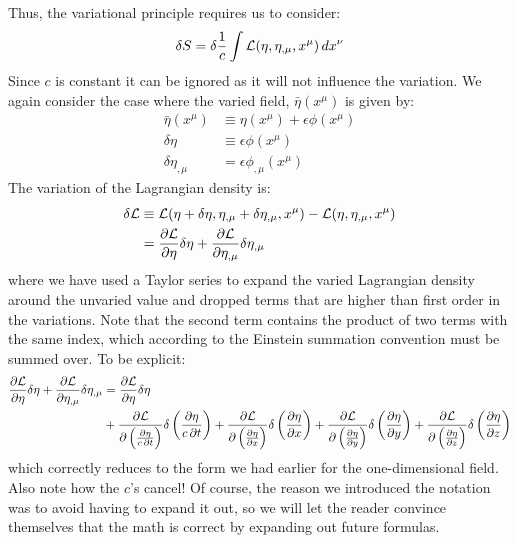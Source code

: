 Thus, the variational principle requires us to consider:
\begin{align}
\delta S=\delta \frac{1}{c} \int \mathcal{L}(\eta,\eta_{,\mu},x^\mu) \,dx^\nu
\end{align}
Since $c$ is constant it can be ignored as it will not influence the variation. We again consider the case where the varied field, $\bar\eta(x^\mu)$ is given by:
\begin{align}
\bar\eta(x^\mu)&\equiv\eta(x^\mu)+\epsilon\phi(x^\mu)\nonumber\\
\delta \eta&\equiv\epsilon\phi(x^\mu)\nonumber\\
\delta \eta_{,\mu}&=\epsilon\phi_{,\mu}(x^\mu)
\end{align}
The variation of the Lagrangian density is:
\begin{align}
\delta \mathcal{L} &\equiv \mathcal{L}(\eta+\delta\eta,\eta_{,\mu}+\delta\eta_{,\mu},x^\mu)-\mathcal{L}(\eta,\eta_{,\mu},x^\mu)\nonumber\\
&=\frac{\partial \mathcal{L}}{\partial \eta}\delta\eta+\frac{\partial \mathcal{L}}{\partial \eta_{,\mu}}\delta\eta_{,\mu}
\end{align}
where we have used a Taylor series to expand the varied Lagrangian density around the unvaried value and dropped terms that are higher than first order in the variations. Note that the second term contains the product of two terms with the same index, which according to the Einstein summation convention must be summed over. To be explicit:
\begin{align}
\frac{\partial \mathcal{L}}{\partial \eta}\delta\eta+\frac{\partial \mathcal{L}}{\partial \eta_{,\mu}}\delta\eta_{,\mu}&=\frac{\partial \mathcal{L}}{\partial \eta}\delta\eta\nonumber\\
&+\frac{\partial \mathcal{L}}{\partial \left(\frac{\partial\eta}{c\,\partial t}\right)}\delta\left(\frac{\partial\eta}{c\,\partial t}\right)+\frac{\partial \mathcal{L}}{\partial \left(\frac{\partial\eta}{\partial x}\right)}\delta\left(\frac{\partial\eta}{\partial x}\right)+\frac{\partial \mathcal{L}}{\partial \left(\frac{\partial\eta}{\partial y}\right)}\delta\left(\frac{\partial\eta}{\partial y}\right)+\frac{\partial \mathcal{L}}{\partial \left(\frac{\partial\eta}{\partial z}\right)}\delta\left(\frac{\partial\eta}{\partial z}\right)
\end{align}
which correctly reduces to the form we had earlier for the one-dimensional field. Also note how the $c$'s cancel! Of course, the reason we introduced the notation was to avoid having to expand it out, so we will let the reader convince themselves that the math is correct by expanding out future formulas.

